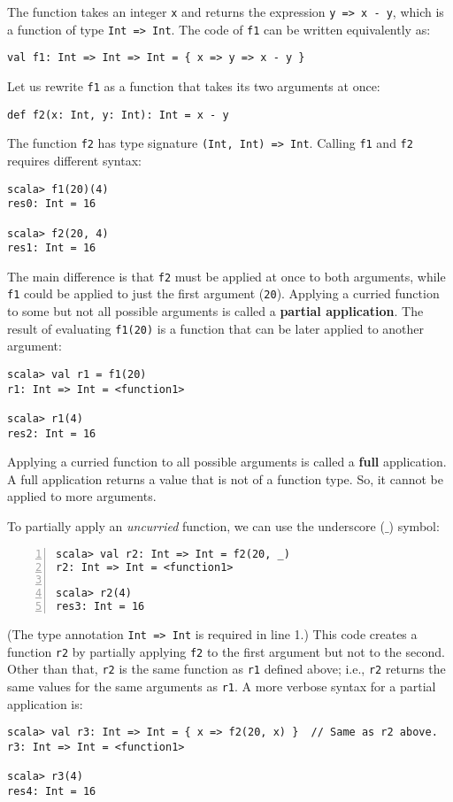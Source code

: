 The function takes an integer \lstinline!x! and returns the expression
\lstinline!y => x - y!, which is a function of type \lstinline!Int => Int!.
The code of \lstinline!f1! can be written equivalently as:
\begin{lstlisting}
val f1: Int => Int => Int = { x => y => x - y }
\end{lstlisting}
Let us rewrite \lstinline!f1! as a function that takes its two arguments
at once:
\begin{lstlisting}
def f2(x: Int, y: Int): Int = x - y
\end{lstlisting}
The function \lstinline!f2! has type signature \lstinline!(Int, Int) => Int!.
Calling \lstinline!f1! and \lstinline!f2! requires different syntax:
\begin{lstlisting}
scala> f1(20)(4)
res0: Int = 16

scala> f2(20, 4)
res1: Int = 16
\end{lstlisting}
The main difference is that \lstinline!f2! must be applied at once
to both arguments, while \lstinline!f1! could be applied to just
the first argument (\lstinline!20!). Applying a curried function
to some but not all possible arguments is called a \textbf{partial
application}. The result of evaluating \lstinline!f1(20)! is a function
that can be later applied to another argument:
\begin{lstlisting}
scala> val r1 = f1(20)
r1: Int => Int = <function1> 

scala> r1(4)
res2: Int = 16
\end{lstlisting}

Applying a curried function to all possible arguments is called a
\textbf{full} application.
A full application returns a value that is not of a function type.
So, it cannot be applied to more arguments.

To partially apply an \emph{uncurried} function, we can use the underscore
($\_$) symbol:
\begin{lstlisting}[numbers=left]
scala> val r2: Int => Int = f2(20, _)
r2: Int => Int = <function1>

scala> r2(4)
res3: Int = 16
\end{lstlisting}
(The type annotation \lstinline!Int => Int! is required in line 1.)
This code creates a function \lstinline!r2! by partially applying
\lstinline!f2! to the first argument but not to the second. Other
than that, \lstinline!r2! is the same function as \lstinline!r1!
defined above; i.e., \lstinline!r2! returns the same values for the
same arguments as \lstinline!r1!. A more verbose syntax for a partial
application is:
\begin{lstlisting}
scala> val r3: Int => Int = { x => f2(20, x) }  // Same as r2 above.
r3: Int => Int = <function1>

scala> r3(4)
res4: Int = 16
\end{lstlisting}

